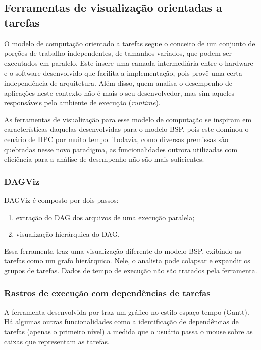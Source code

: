 \subsection{Ferramentas de visualização orientadas a tarefas}

O modelo de computação orientado a tarefas segue o conceito de um conjunto de 
porções de trabalho independentes, de tamanhos variados, que podem ser 
executados em paralelo. Este insere uma camada intermediária entre o 
hardware e o software desenvolvido que facilita a implementação, pois provê uma 
certa independência de arquitetura. Além disso, quem analisa o desempenho de 
aplicações neste contexto não é mais o seu desenvolvedor, mas sim aqueles 
responsáveis pelo ambiente de execução (\textit{runtime}).

As ferramentas de visualização para esse modelo de computação se inspiram em 
características daquelas desenvolvidas para o modelo BSP, pois este dominou o 
cenário de HPC por muito tempo. Todavia, como diversas premissas são quebradas 
nesse novo paradigma, as funcionalidades outrora utilizadas com eficiência 
para a análise de desempenho não são mais suficientes.

\subsubsection*{DAGViz}

DAGViz \cite{ref:dagviz} é composto por dois passos: 

\begin{enumerate}
    \item extração do DAG dos arquivos de uma execução paralela;
    \item visualização hierárquica do DAG.
\end{enumerate}

Essa ferramenta traz uma visualização diferente do modelo BSP, exibindo as 
tarefas como um grafo hierárquico. Nele, o analista pode colapsar e expandir os 
grupos de tarefas. Dados de tempo de execução não são tratados pela ferramenta.

\subsubsection*{Rastros de execução com dependências de tarefas}

A ferramenta desenvolvida por \citet{ref:visuexecdep} traz um gráfico no estilo 
espaço-tempo (Gantt). Há algumas outras funcionalidades como a identificação de 
dependências de tarefas (apenas o primeiro nível) a medida que o usuário passa o 
mouse sobre as caixas que representam as tarefas.

